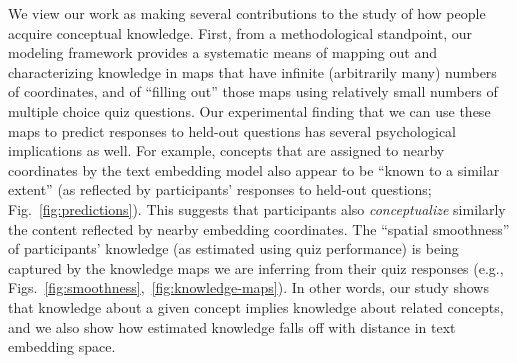 \documentclass[10pt]{article}
\begin{document}
We view our work as making several contributions to the study of how people
acquire conceptual knowledge. First, from a methodological standpoint, our
modeling framework provides a systematic means of mapping out and
characterizing knowledge in maps that have infinite (arbitrarily many) numbers
of coordinates, and of ``filling out'' those maps using relatively small
numbers of multiple choice quiz questions. Our experimental finding that we can
use these maps to predict responses to held-out questions has several
psychological implications as well. For example, concepts that are assigned to
nearby coordinates by the text embedding model also appear to be ``known to a
similar extent'' (as reflected by participants' responses to held-out
questions; Fig.~\ref{fig:predictions}). This suggests that participants also
\textit{conceptualize} similarly the content reflected by nearby embedding
coordinates. The ``spatial smoothness'' of participants' knowledge (as
estimated using quiz performance) is being captured by the knowledge maps we
are inferring from their quiz responses (e.g.,
Figs.~\ref{fig:smoothness},~\ref{fig:knowledge-maps}). In other words, our
study shows that knowledge about a given concept implies knowledge about
related concepts, and we also show how estimated knowledge falls off with
distance in text embedding space.
\end{document}
